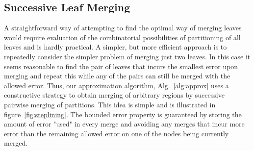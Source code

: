 \subsection{Successive Leaf Merging}

A straightforward way of attempting to find the optimal way of merging leaves would require evaluation of the combinatorial possibilities of partitioning of all leaves and is hardly practical. A simpler, but more efficient approach is to repeatedly consider the simpler problem of merging just two leaves. In this case it seems reasonable to find the pair of leaves that incurs the smallest error upon merging and repeat this while any of the pairs can still be merged with the allowed error. Thus, our approximation algorithm, Alg.~\ref{alg:approx} uses a constructive strategy to obtain merging of arbitrary regions by successive pairwise merging of partitions. This idea is simple and is illustrated in figure~\ref{fig:steplining}. The bounded error property is guaranteed by storing the amount of error "used" in every merge and avoiding any merges that incur more error than the remaining allowed error on one of the nodes being currently merged.

